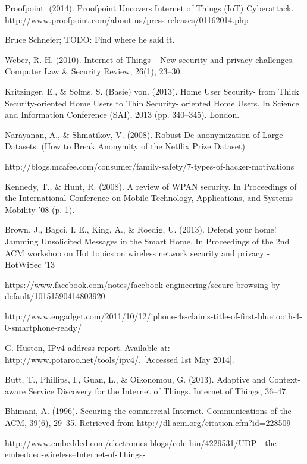 \documentclass[10pt,journal,compsoc]{IEEEtran}
\begin{document}
\begin{thebibliography}{1}
Proofpoint. (2014). Proofpoint Uncovers Internet of Things (IoT) Cyberattack. http://www.proofpoint.com/about-us/press-releases/01162014.php

Bruce Schneier; TODO: Find where he said it.

Weber, R. H. (2010). Internet of Things – New security and privacy challenges. Computer Law \& Security Review, 26(1), 23–30. 

Kritzinger, E., \& Solms, S. (Basie) von. (2013). Home User Security- from Thick Security-oriented Home Users to Thin Security- oriented Home Users. In Science and Information Conference (SAI), 2013 (pp. 340–345). London.

Narayanan, A., \& Shmatikov, V. (2008). Robust De-anonymization of Large Datasets. (How to Break Anonymity of the Netflix Prize Dataset)

http://blogs.mcafee.com/consumer/family-safety/7-types-of-hacker-motivations

Kennedy, T., \& Hunt, R. (2008). A review of WPAN security. In Proceedings of the International Conference on Mobile Technology, Applications, and Systems - Mobility ’08 (p. 1).

Brown, J., Bagci, I. E., King, A., \& Roedig, U. (2013). Defend your home! Jamming Unsolicited Messages in the Smart Home. In Proceedings of the 2nd ACM workshop on Hot topics on wireless network security and privacy - HotWiSec ’13 

https://www.facebook.com/notes/facebook-engineering/secure-browsing-by-default/10151590414803920

http://www.engadget.com/2011/10/12/iphone-4s-claims-title-of-first-bluetooth-4-0-smartphone-ready/

G. Huston, IPv4 address report.􏰄Available at: http://www.potaroo.net/tools/ipv4/. [Accessed 1st May 2014].

Butt, T., Phillips, I., Guan, L., \& Oikonomou, G. (2013). Adaptive and Context-aware Service Discovery for the Internet of Things. Internet of Things, 36–47. 

Bhimani, A. (1996). Securing the commercial Internet. Communications of the ACM, 39(6), 29–35. Retrieved from http://dl.acm.org/citation.cfm?id=228509

http://www.embedded.com/electronics-blogs/cole-bin/4229531/UDP---the-embedded-wireless--Internet-of-Things-

\end{thebibliography}



\end{document}
